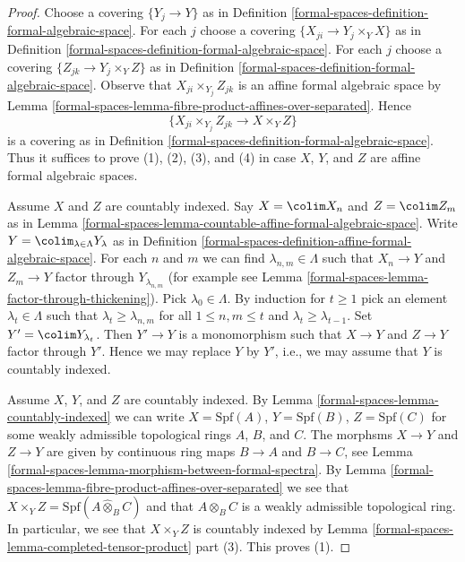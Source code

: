 \begin{proof}
Choose a covering $\{Y_j \to Y\}$ as in
Definition \ref{formal-spaces-definition-formal-algebraic-space}.
For each $j$ choose a covering $\{X_{ji} \to Y_j \times_Y X\}$
as in Definition \ref{formal-spaces-definition-formal-algebraic-space}.
For each $j$ choose a covering $\{Z_{jk} \to Y_j \times_Y Z\}$
as in Definition \ref{formal-spaces-definition-formal-algebraic-space}.
Observe that $X_{ji} \times_{Y_j} Z_{jk}$ is an
affine formal algebraic space by
Lemma \ref{formal-spaces-lemma-fibre-product-affines-over-separated}.
Hence
$$
\{X_{ji} \times_{Y_j} Z_{jk} \to X \times_Y Z\}
$$
is a covering as in Definition \ref{formal-spaces-definition-formal-algebraic-space}.
Thus it suffices to prove (1), (2), (3), and (4) in case $X$, $Y$, and $Z$
are affine formal algebraic spaces.

\medskip\noindent
Assume $X$ and $Z$ are countably indexed. Say $X = \colim X_n$ and
$Z = \colim Z_m$ as in
Lemma \ref{formal-spaces-lemma-countable-affine-formal-algebraic-space}.
Write $Y = \colim_{\lambda \in \Lambda} Y_\lambda$ as in
Definition \ref{formal-spaces-definition-affine-formal-algebraic-space}.
For each $n$ and $m$ we can find $\lambda_{n, m} \in \Lambda$
such that $X_n \to Y$ and $Z_m \to Y$ factor through $Y_{\lambda_{n, m}}$
(for example see Lemma \ref{formal-spaces-lemma-factor-through-thickening}).
Pick $\lambda_0 \in \Lambda$. By induction for $t \geq 1$
pick an element $\lambda_t \in \Lambda$ such that
$\lambda_t \geq \lambda_{n, m}$ for all $1 \leq n, m \leq t$
and $\lambda_t \geq \lambda_{t - 1}$. Set $Y' = \colim Y_{\lambda_t}$.
Then $Y' \to Y$ is a monomorphism such that $X \to Y$ and $Z \to Y$
factor through $Y'$. Hence we may replace $Y$ by $Y'$, i.e.,
we may assume that $Y$ is countably indexed.

\medskip\noindent
Assume $X$, $Y$, and $Z$ are countably indexed. By
Lemma \ref{formal-spaces-lemma-countably-indexed} we can write
$X = \text{Spf}(A)$, $Y = \text{Spf}(B)$, $Z = \text{Spf}(C)$
for some weakly admissible topological rings $A$, $B$, and $C$.
The morphsms $X \to Y$ and $Z \to Y$ are given by
continuous ring maps $B \to A$ and $B \to C$, see
Lemma \ref{formal-spaces-lemma-morphism-between-formal-spectra}.
By Lemma \ref{formal-spaces-lemma-fibre-product-affines-over-separated}
we see that $X \times_Y Z = \text{Spf}(A \widehat{\otimes}_B C)$
and that $A \widehat{\otimes}_B C$ is a weakly admissible topological ring.
In particular, we see that $X \times_Y Z$ is countably indexed
by Lemma \ref{formal-spaces-lemma-completed-tensor-product} part (3).
This proves (1).


\end{proof}
